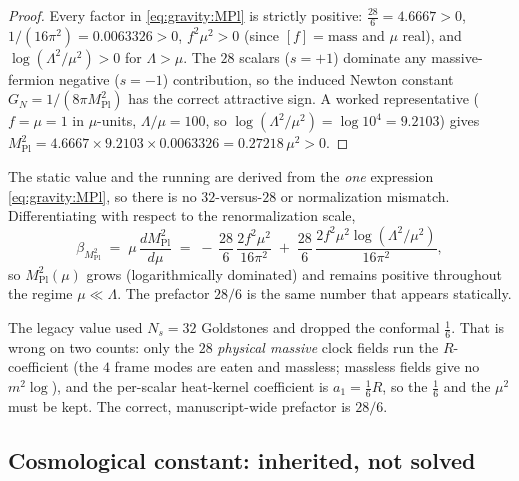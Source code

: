 \begin{proof}
Every factor in \eqref{eq:gravity:MPl} is strictly positive:
$\tfrac{28}{6}=4.6667>0$, $1/(16\pi^{2})=0.0063326>0$, $f^{2}\mu^{2}>0$
(since $[f]=\text{mass}$ and $\mu$ real), and
$\log(\Lambda^{2}/\mu^{2})>0$ for $\Lambda>\mu$. The $28$ scalars
($s=+1$) dominate any massive-fermion negative ($s=-1$) contribution, so the
induced Newton constant $G_{N}=1/(8\pi M_{\mathrm{Pl}}^{2})$ has the correct
attractive sign. A worked representative ($f=\mu=1$ in $\mu$-units,
$\Lambda/\mu=100$, so $\log(\Lambda^{2}/\mu^{2})=\log 10^{4}=9.2103$) gives
$M_{\mathrm{Pl}}^{2}=4.6667\times 9.2103\times 0.0063326=0.27218\,\mu^{2}>0$.
\end{proof}

\begin{remark}
\label{rmk:gravity:running}
The static value and the running are derived from the \emph{one}
expression \eqref{eq:gravity:MPl}, so there is no $32$-versus-$28$ or
normalization mismatch. Differentiating with respect to the renormalization
scale,
\begin{equation}\label{eq:gravity:betaMPl}
  \beta_{M_{\mathrm{Pl}}^{2}}
  \;=\;
  \mu\,\frac{d M_{\mathrm{Pl}}^{2}}{d\mu}
  \;=\;
  -\,\frac{28}{6}\,\frac{2 f^{2}\mu^{2}}{16\pi^{2}}
  \;+\;\frac{28}{6}\,\frac{2 f^{2}\mu^{2}\log(\Lambda^{2}/\mu^{2})}{16\pi^{2}},
\end{equation}
so $M_{\mathrm{Pl}}^{2}(\mu)$ grows (logarithmically dominated) and remains
positive throughout the regime $\mu\ll\Lambda$. The prefactor $28/6$ is the
same number that appears statically.
\end{remark}

\begin{remark}
\label{rmk:gravity:2832}
The legacy value used $N_{s}=32$ Goldstones and dropped the conformal
$\tfrac16$. That is wrong on two counts: only the $28$ \emph{physical
massive} clock fields run the $R$-coefficient (the $4$ frame modes are eaten
and massless; massless fields give no $m^{2}\log$), and the per-scalar
heat-kernel coefficient is $a_{1}=\tfrac16 R$, so the $\tfrac16$ and the
$\mu^{2}$ must be kept. The correct, manuscript-wide prefactor is
$28/6$.
\end{remark}

\subsection{Cosmological constant: inherited, not solved}
\label{sec:gravity:cc}

